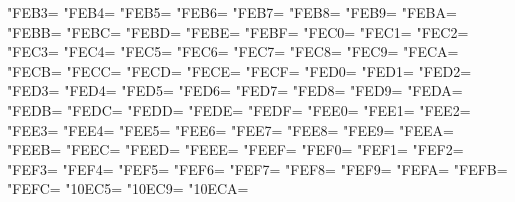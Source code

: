 \XeTeXcharclass"FEB3=\KclassArabU
\XeTeXcharclass"FEB4=\KclassArabU
\XeTeXcharclass"FEB5=\KclassArabU
\XeTeXcharclass"FEB6=\KclassArabU
\XeTeXcharclass"FEB7=\KclassArabU
\XeTeXcharclass"FEB8=\KclassArabU
\XeTeXcharclass"FEB9=\KclassArabU
\XeTeXcharclass"FEBA=\KclassArabU
\XeTeXcharclass"FEBB=\KclassArabU
\XeTeXcharclass"FEBC=\KclassArabU
\XeTeXcharclass"FEBD=\KclassArabU
\XeTeXcharclass"FEBE=\KclassArabU
\XeTeXcharclass"FEBF=\KclassArabU
\XeTeXcharclass"FEC0=\KclassArabU
\XeTeXcharclass"FEC1=\KclassArabU
\XeTeXcharclass"FEC2=\KclassArabU
\XeTeXcharclass"FEC3=\KclassArabU
\XeTeXcharclass"FEC4=\KclassArabU
\XeTeXcharclass"FEC5=\KclassArabU
\XeTeXcharclass"FEC6=\KclassArabU
\XeTeXcharclass"FEC7=\KclassArabU
\XeTeXcharclass"FEC8=\KclassArabU
\XeTeXcharclass"FEC9=\KclassArabU
\XeTeXcharclass"FECA=\KclassArabU
\XeTeXcharclass"FECB=\KclassArabU
\XeTeXcharclass"FECC=\KclassArabU
\XeTeXcharclass"FECD=\KclassArabU
\XeTeXcharclass"FECE=\KclassArabU
\XeTeXcharclass"FECF=\KclassArabU
\XeTeXcharclass"FED0=\KclassArabU
\XeTeXcharclass"FED1=\KclassArabU
\XeTeXcharclass"FED2=\KclassArabU
\XeTeXcharclass"FED3=\KclassArabU
\XeTeXcharclass"FED4=\KclassArabU
\XeTeXcharclass"FED5=\KclassArabU
\XeTeXcharclass"FED6=\KclassArabU
\XeTeXcharclass"FED7=\KclassArabU
\XeTeXcharclass"FED8=\KclassArabU
\XeTeXcharclass"FED9=\KclassArabU
\XeTeXcharclass"FEDA=\KclassArabU
\XeTeXcharclass"FEDB=\KclassArabU
\XeTeXcharclass"FEDC=\KclassArabU
\XeTeXcharclass"FEDD=\KclassArabU
\XeTeXcharclass"FEDE=\KclassArabU
\XeTeXcharclass"FEDF=\KclassArabU
\XeTeXcharclass"FEE0=\KclassArabU
\XeTeXcharclass"FEE1=\KclassArabU
\XeTeXcharclass"FEE2=\KclassArabU
\XeTeXcharclass"FEE3=\KclassArabU
\XeTeXcharclass"FEE4=\KclassArabU
\XeTeXcharclass"FEE5=\KclassArabU
\XeTeXcharclass"FEE6=\KclassArabU
\XeTeXcharclass"FEE7=\KclassArabU
\XeTeXcharclass"FEE8=\KclassArabU
\XeTeXcharclass"FEE9=\KclassArabU
\XeTeXcharclass"FEEA=\KclassArabU
\XeTeXcharclass"FEEB=\KclassArabU
\XeTeXcharclass"FEEC=\KclassArabU
\XeTeXcharclass"FEED=\KclassArabU
\XeTeXcharclass"FEEE=\KclassArabU
\XeTeXcharclass"FEEF=\KclassArabU
\XeTeXcharclass"FEF0=\KclassArabU
\XeTeXcharclass"FEF1=\KclassArabU
\XeTeXcharclass"FEF2=\KclassArabU
\XeTeXcharclass"FEF3=\KclassArabU
\XeTeXcharclass"FEF4=\KclassArabU
\XeTeXcharclass"FEF5=\KclassArabU
\XeTeXcharclass"FEF6=\KclassArabU
\XeTeXcharclass"FEF7=\KclassArabU
\XeTeXcharclass"FEF8=\KclassArabU
\XeTeXcharclass"FEF9=\KclassArabU
\XeTeXcharclass"FEFA=\KclassArabU
\XeTeXcharclass"FEFB=\KclassArabU
\XeTeXcharclass"FEFC=\KclassArabU
\XeTeXcharclass"10EC5=\KclassArabU
\XeTeXcharclass"10EC9=\KclassArabU
\XeTeXcharclass"10ECA=\KclassArabU
